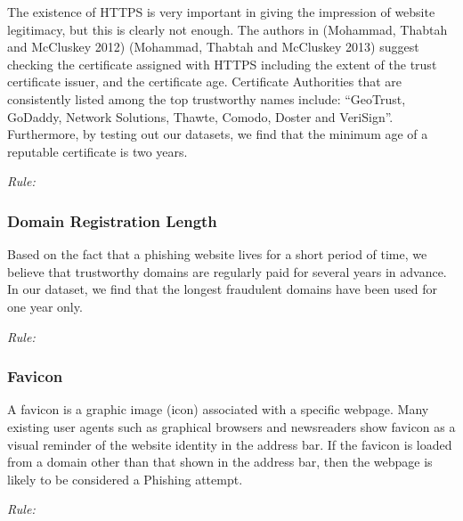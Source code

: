 \documentclass[twocolumn,10pt]{article}
\begin{document}
The existence of HTTPS is very important in giving the impression of website legitimacy, but this is clearly not enough. The authors in (Mohammad, Thabtah and McCluskey 2012) (Mohammad, Thabtah and McCluskey 2013) suggest checking the certificate assigned with HTTPS including the extent of the trust certificate issuer, and the certificate age. Certificate Authorities that are consistently listed among the top trustworthy names include: “GeoTrust, GoDaddy, Network Solutions, Thawte, Comodo, Doster and VeriSign”. Furthermore, by testing out our datasets, we find that the minimum age of a reputable certificate is two years.
\begin{center}
	\it Rule:
\end{center}
\subsubsection{Domain Registration Length}

Based on the fact that a phishing website lives for a short period of time, we believe that trustworthy domains are regularly paid for several years in advance. In our dataset, we find that the longest fraudulent domains have been used for one year only. 
\begin{center}
	\it Rule:
\end{center}
\subsubsection{Favicon}

A favicon is a graphic image (icon) associated with a specific webpage. Many existing user agents such as graphical browsers and newsreaders show favicon as a visual reminder of the website identity in the address bar. If the favicon is loaded from a domain other than that shown in the address bar, then the webpage is likely to be considered a Phishing attempt. 
\begin{center}
	\it Rule:
\end{center}
\end{document}
